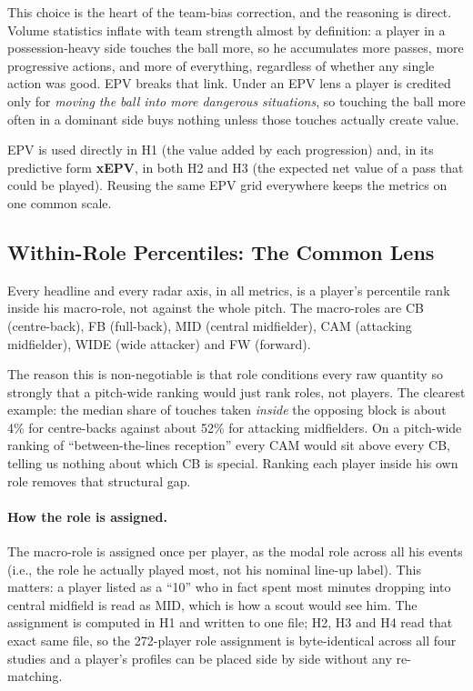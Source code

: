 \documentclass[12pt,a4paper]{article}
\begin{document}
This choice is the heart of the team-bias correction, and the reasoning is direct.
Volume statistics inflate with team strength almost by definition: a player in a possession-heavy side touches the ball more, so he accumulates more passes, more progressive actions, and more of everything, regardless of whether any single action was good.
EPV breaks that link.
Under an EPV lens a player is credited only for \emph{moving the ball into more dangerous situations}, so touching the ball more often in a dominant side buys nothing unless those touches actually create value.

EPV is used directly in H1 (the value added by each progression) and, in its predictive form \textbf{xEPV}, in both H2 and H3 (the expected net value of a pass that could be played).
Reusing the same EPV grid everywhere keeps the metrics on one common scale.

\subsection{Within-Role Percentiles: The Common Lens}\label{sec:roles}

Every headline and every radar axis, in all metrics, is a player's percentile rank inside his macro-role, not against the whole pitch.
The macro-roles are CB (centre-back), FB (full-back), MID (central midfielder), CAM (attacking midfielder), WIDE (wide attacker) and FW (forward).

The reason this is non-negotiable is that role conditions every raw quantity so strongly that a pitch-wide ranking would just rank roles, not players.
The clearest example: the median share of touches taken \emph{inside} the opposing block is about 4\% for centre-backs against about 52\% for attacking midfielders.
On a pitch-wide ranking of ``between-the-lines reception'' every CAM would sit above every CB, telling us nothing about which CB is special.
Ranking each player inside his own role removes that structural gap.

\paragraph{How the role is assigned.}
The macro-role is assigned once per player, as the modal role across all his events (i.e., the role he actually played most, not his nominal line-up label).
This matters: a player listed as a ``10'' who in fact spent most minutes dropping into central midfield is read as MID, which is how a scout would see him.
The assignment is computed in H1 and written to one file; H2, H3 and H4 read that exact same file, so the 272-player role assignment is byte-identical across all four studies and a player's profiles can be placed side by side without any re-matching.
\end{document}
